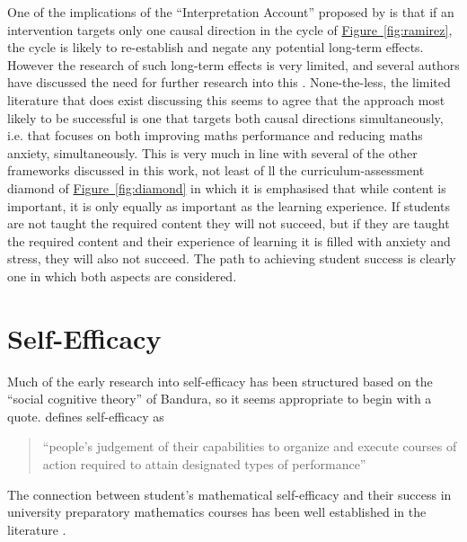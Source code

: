 \documentclass[twoside,12pt,a4paper]{report}
\newcommand{\reffig}[1]{\hyperref[fig:#1]{Figure~\ref{fig:#1}}}
\begin{document}
One of the implications of the ``Interpretation Account'' proposed by is that if an intervention targets only one causal direction in the cycle of \reffig{ramirez}, the cycle is likely to re-establish and negate any potential long-term effects. However the research of such long-term effects is very limited, and several authors have discussed the need for further research into this \cite{Pellicioni2016,Chang2016}. None-the-less, the limited literature that does exist discussing this seems to agree that the approach most likely to be successful is one that targets both causal directions simultaneously, i.e. that focuses on both improving maths performance and reducing maths anxiety, simultaneously. This is very much in line with several of the other frameworks discussed in this work, not least of ll the curriculum-assessment diamond of \reffig{diamond} in which it is emphasised that while content is important, it is only equally as important as the learning experience. If students are not taught the required content they will not succeed, but if they are taught the required content and their experience of learning it is filled with anxiety and stress, they will also not succeed. The path to achieving student success is clearly one in which both aspects are considered. 









\section{Self-Efficacy}

Much of the early research into self-efficacy has been structured based on the ``social cognitive theory'' of Bandura, so it seems appropriate to begin with a quote.  defines self-efficacy as 
\begin{quote}
``people’s judgement of their capabilities to organize and execute
courses of action required to attain designated types of performance''
\end{quote}


The connection between student's mathematical self-efficacy and their success in university preparatory mathematics courses has been well established in the literature \cite{Burton1987, Klinger2006, Klinger2011}. 
\end{document}
